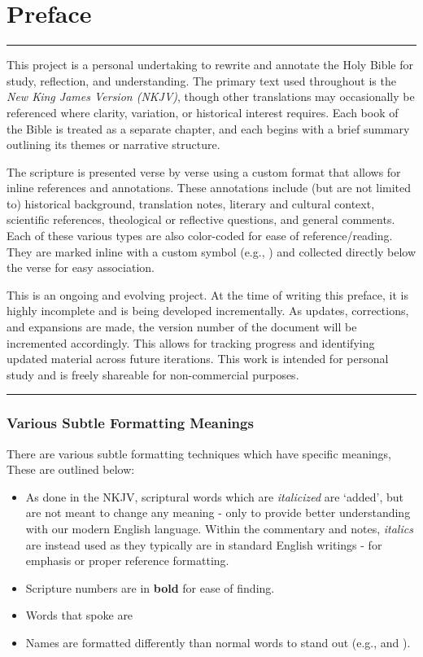 \chapter{Preface}
\rule{\textwidth}{0.5pt}    %
\thispagestyle{fancy}

This project is a personal undertaking to rewrite and annotate the Holy Bible for study, reflection, and understanding. The primary text used throughout is the \textit{New King James Version (NKJV)}, though other translations may occasionally be referenced where clarity, variation, or historical interest requires. Each book of the Bible is treated as a separate chapter, and each begins with a brief summary outlining its themes or narrative structure.

\tab The scripture is presented verse by verse using a custom format that allows for inline references and annotations. These annotations include (but are not limited to) historical background, translation notes, literary and cultural context, scientific references, theological or reflective questions, and general comments. Each of these various types are also color-coded for ease of reference/reading. They are marked inline with a custom symbol (e.g., \vmark{$\star$}) and collected directly below the verse for easy association.

\tab This is an ongoing and evolving project. At the time of writing this preface, it is highly incomplete and is being developed incrementally. As updates, corrections, and expansions are made, the version number of the document will be incremented accordingly. This allows for tracking progress and identifying updated material across future iterations. This work is intended for personal study and is freely shareable for non-commercial purposes.

\rule{\textwidth}{0.5pt}    %


\subsection*{Various Subtle Formatting Meanings}

There are various subtle formatting techniques which have specific meanings, These are outlined below:
\begin{itemize}
	\item As done in the NKJV, scriptural words which are \textit{italicized} are `added', but are not meant to change any meaning - only to provide better understanding with our modern English language. Within the commentary and notes, \textit{italics} are instead used as they typically are in standard English writings - for emphasis or proper reference formatting.
	\item Scripture numbers are in \textbf{bold} for ease of finding.
	\item Words that  spoke are 
	\item Names are formatted differently than normal words to stand out (e.g.,  and ).
\end{itemize}




